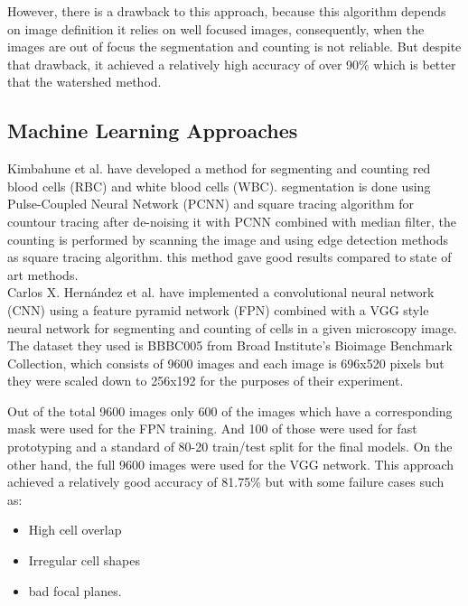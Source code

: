 However, there is a drawback to this approach, because this algorithm depends on image definition it relies on well focused images, consequently, when the images are out of focus the segmentation and counting is not reliable. But despite that drawback, it achieved a relatively high accuracy of over 90\% which is better that the watershed method.

\newpage

\subsection{Machine Learning Approaches}

Kimbahune et al. \textsuperscript{\cite{kimbahune2011blood}} have developed a method for segmenting and counting red blood cells (RBC) and white blood cells (WBC).
segmentation is done using Pulse-Coupled Neural Network (PCNN) and square tracing algorithm for countour tracing after de-noising it with PCNN combined with median filter, the counting is performed by scanning the image and using edge detection methods as square tracing algorithm. this method gave good results compared to state of art methods.\\

Carlos X. Hern{\'{a}}ndez et al. \textsuperscript{\cite{DBLP:journals/corr/abs-1802-10548}} have implemented a convolutional neural network (CNN) using a feature pyramid network (FPN) combined with a VGG style neural network for segmenting and counting of cells in a given microscopy image.
The dataset they used is BBBC005 \textsuperscript{\cite{ljosa2012annotated}} from Broad Institute's Bioimage Benchmark Collection, which consists of 9600 images and each image is 696x520 pixels but they were scaled down to 256x192 for the purposes of their experiment.

Out of the total 9600 images only 600 of the images which have a corresponding mask were used for the FPN training. And 100 of those were used for fast prototyping and a standard of 80-20 train/test split for the final models.
On the other hand, the full 9600 images were used for the VGG network.
This approach achieved a relatively good accuracy of 81.75\% but with some failure cases such as:

\begin{itemize}
  \item High cell overlap
  \item Irregular cell shapes
  \item bad focal planes.
\end{itemize}

